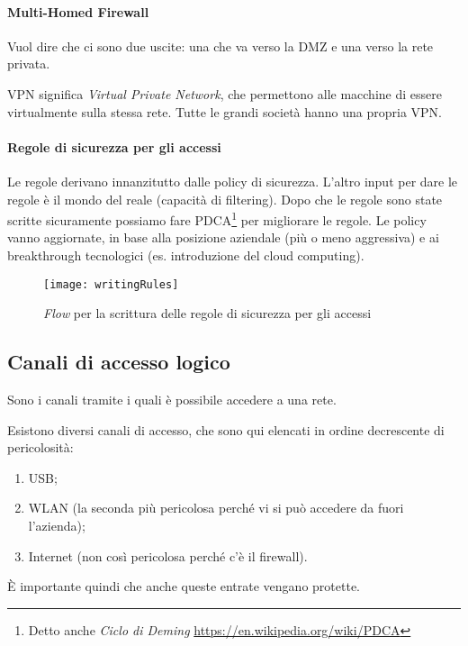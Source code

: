 \paragraph*{Multi-Homed Firewall}

Vuol dire che ci sono due uscite: una che va verso la DMZ e una verso la rete
privata.

VPN significa \textit{Virtual Private Network}, che permettono alle macchine di
essere virtualmente sulla stessa rete. Tutte le grandi società hanno una propria
VPN.

\paragraph*{Regole di sicurezza per gli accessi}

Le regole derivano innanzitutto dalle policy di sicurezza. L'altro input per
dare le regole è il mondo del reale (capacità di filtering). Dopo che le regole
sono state scritte sicuramente possiamo fare PDCA\footnote{Detto anche
\textit{Ciclo di Deming} \url{https://en.wikipedia.org/wiki/PDCA}} per
migliorare le regole. Le policy vanno aggiornate,
in base alla posizione aziendale (più o meno aggressiva) e ai breakthrough
tecnologici (es. introduzione del cloud computing).

\begin{figure}[H]
 \centering
 \texttt{[image: writingRules]}
 \caption{\textit{Flow} per la scrittura delle regole di sicurezza per gli
accessi}
\end{figure}

\subsection{Canali di accesso logico}

Sono i canali tramite i quali è possibile accedere a una rete.

Esistono diversi canali di accesso, che sono qui elencati in ordine
decrescente di pericolosità:
\begin{enumerate}
 \item USB;
 \item WLAN (la seconda più pericolosa perché vi si può accedere da fuori
l'azienda);
 \item Internet (non così pericolosa perché c'è il firewall).
\end{enumerate}

È importante quindi che anche queste entrate vengano protette.

